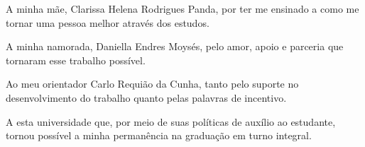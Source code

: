 \documentclass[
	12pt,				%
	openright,			%
	oneside,			%
	a4paper,			%
	english,			%
	french,				%
	spanish,			%
	brazil				%
	]{abntex2}
\begin{document}
\begin{agradecimentos}

A minha mãe, Clarissa Helena Rodrigues Panda, por ter me ensinado a como me tornar uma pessoa melhor através dos estudos.

A minha namorada, Daniella Endres Moysés, pelo amor, apoio e parceria que tornaram esse trabalho possível.

Ao meu orientador Carlo Requião da Cunha, tanto pelo suporte no desenvolvimento do trabalho quanto pelas palavras de incentivo.

A esta universidade que, por meio de suas políticas de auxílio ao estudante, tornou possível a minha permanência na graduação em turno integral.

\end{agradecimentos}

\end{document}
